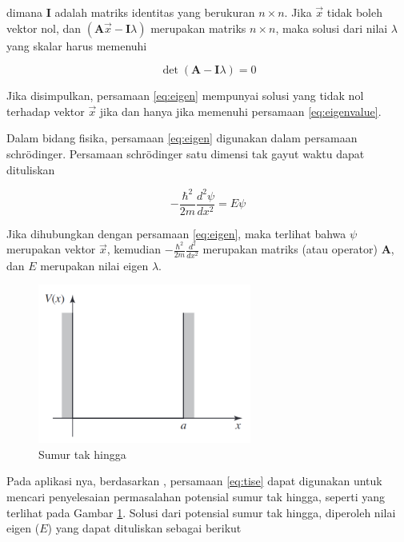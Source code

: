 \noindent
dimana $\mathbf{I}$ adalah matriks identitas yang berukuran $n \times n$. Jika
$\vec{x}$ tidak boleh vektor nol, dan $( \mathbf{A}\vec{x}- \mathbf{I}\lambda )$
merupakan matriks $n \times n$, maka solusi dari nilai $\lambda$ yang skalar
harus memenuhi

\begin{equation}
  \label{eq:eigenvalue}\det{(\mathbf{A} - \mathbf{I} \lambda)}= 0
\end{equation}

\noindent
Jika disimpulkan, persamaan \ref{eq:eigen} mempunyai solusi yang tidak nol terhadap
vektor $\vec{x}$ jika dan hanya jika memenuhi persamaan \ref{eq:eigenvalue}.

Dalam bidang fisika, persamaan \ref{eq:eigen} digunakan dalam persamaan
schrödinger. Persamaan schrödinger satu dimensi tak gayut waktu dapat
dituliskan

\begin{equation} \label{eq:tise} %
  -\frac{\hbar^2}{2m} \frac{d^2\psi}{dx^2} = E\psi
\end{equation}

\noindent
Jika dihubungkan dengan persamaan \ref{eq:eigen}, maka terlihat bahwa $\psi$
merupakan vektor $\vec{x}$, kemudian $-\frac{\hbar^2}{2m} \frac{d^2}{dx^2}$ merupakan
matriks (atau operator) $\mathbf{A}$, dan $E$ merupakan nilai eigen $\lambda$.

\begin{figure}[h]
  \centering
  \includegraphics[width=7cm]{images/infinite_square_well.png}
  \caption{Sumur tak hingga}
  \label{img:infinite_square_well}
\end{figure}

Pada aplikasi nya, berdasarkan
\cite{griffithsIntroductionQuantumMechanics2019}, persamaan \ref{eq:tise} dapat
digunakan untuk mencari penyelesaian permasalahan potensial sumur tak hingga,
seperti yang terlihat pada Gambar \ref{img:infinite_square_well}. Solusi dari
potensial sumur tak hingga, diperoleh nilai eigen ($E$) yang dapat dituliskan
sebagai berikut

